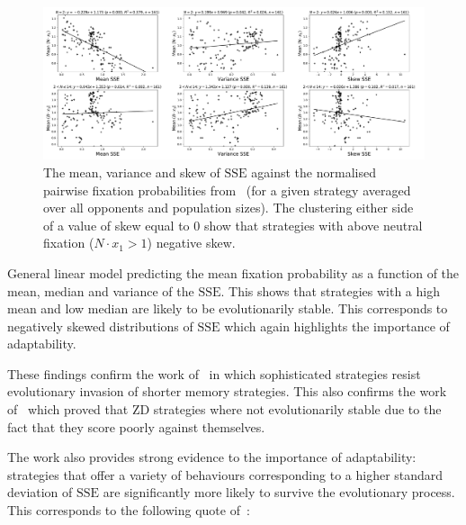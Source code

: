 \documentclass[a4paper]{article}
\newcommand{\SSe}{\text{SSE}}
\begin{document}
\begin{figure}[!hbtp]
    \centering
    \includegraphics[width=\textwidth]{./assets/img/compare-fixation-to-sserror/main.pdf}
    \caption{The mean, variance and skew of
    \(\SSe\) against the normalised pairwise fixation probabilities
    from~\cite{Moran1707} (for a given strategy averaged over all opponents and
    population sizes). The clustering either side of a value of skew equal to
    0 show that strategies with above neutral
    fixation (\(N\cdot x_1>1\)) negative skew.}
    \label{fig:compare-fixation-to-sserror}
\end{figure}

\begin{table}[!hbtp]
    \begin{center}
    \tiny
    
    \end{center}
    \caption{General linear model predicting the mean fixation probability as a
    function of the mean, median and variance of the \(\SSe\). This shows that strategies with a high mean
        and low median are likely to be evolutionarily stable. This corresponds
        to negatively skewed distributions of \(\SSe\) which again highlights
        the importance of adaptability.}
    \label{tbl:compare-fixation-to-sserror}
\end{table}

These findings confirm the work of~\cite{Moran1707} in which sophisticated
strategies resist evolutionary invasion of shorter memory strategies. This also
confirms the work of~\cite{adami2013evolutionary, hilbe2015partners} which
proved that ZD strategies where not evolutionarily stable due to the fact that
they score poorly against themselves.

The work also provides strong evidence to the importance of adaptability:
strategies that offer a variety of behaviours corresponding to a higher standard
deviation of \(\SSe\) are significantly more likely to survive the
evolutionary process. This corresponds to the following quote
of~\cite{darwin1869origin}:
\end{document}
